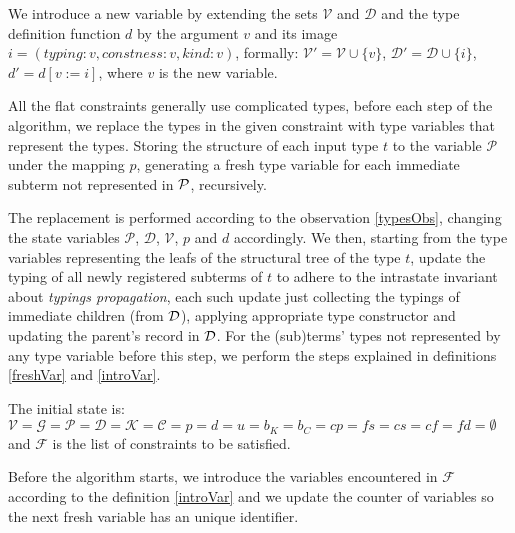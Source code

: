 \begin{defn}
    \label{introVar}
    We introduce a new variable by extending the sets $\mathcal{V}$ and $\mathcal{D}$
    and the type definition function $d$ by the argument $v$ and its image $i = (typing: v, constness: v, kind: v)$, formally: $\mathcal{V}' = \mathcal{V} \cup \{v\}$, $\mathcal{D}' = \mathcal{D} \cup \{i\}$, $d' = d [v := i]$, where $v$ is the new variable.
\end{defn}
\begin{defn}
    \label{presteps}

    All the flat constraints generally use complicated types, before each step of the algorithm, we replace the types in the given constraint with type variables that represent the types. Storing the structure of each input type $t$ to the variable $\mathcal P$ under the mapping $p$, generating a fresh type variable for each immediate subterm not represented in $\mathcal P$, recursively.

    The replacement is performed according to the observation \ref{typesObs}, changing the state variables $\mathcal{P}$, $\mathcal{D}$, $\mathcal{V}$, $p$ and $d$ accordingly. We then, starting from the type variables representing the leafs of the structural tree of the type $t$, update the typing of all newly registered subterms of $t$ to adhere to the intrastate invariant about \emph{typings propagation}, each such update just collecting the typings of immediate children (from $\mathcal D$), applying appropriate type constructor and updating the parent's record in $\mathcal D$. For the (sub)terms' types not represented by any type variable before this step, we perform the steps explained in definitions \ref{freshVar} and \ref{introVar}.
\end{defn}

\begin{defn}
    The initial state is: $\mathcal{V} = \mathcal{G} = \mathcal{P} = \mathcal{D} = \mathcal{K} = \mathcal{C} = p = d = u = b_K = b_C = cp = fs = cs = cf = fd = \emptyset$ and $\mathcal{F}$ is the list of constraints to be satisfied.

    Before the algorithm starts, we introduce the variables encountered in $\mathcal{F}$ according to the definition \ref{introVar} and we update the counter of variables so the next fresh variable has an unique identifier.
\end{defn}

